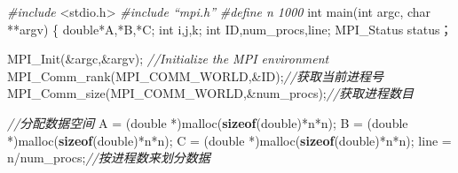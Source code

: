 \documentclass[]{ctexbook}
\newenvironment{Shaded}{\begin{snugshade}}{\end{snugshade}}
\newcommand{\CommentTok}[1]{\textcolor[rgb]{0.56,0.35,0.01}{\textit{#1}}}
\newcommand{\DataTypeTok}[1]{\textcolor[rgb]{0.13,0.29,0.53}{#1}}
\newcommand{\ImportTok}[1]{#1}
\newcommand{\KeywordTok}[1]{\textcolor[rgb]{0.13,0.29,0.53}{\textbf{#1}}}
\newcommand{\NormalTok}[1]{#1}
\newcommand{\PreprocessorTok}[1]{\textcolor[rgb]{0.56,0.35,0.01}{\textit{#1}}}
\begin{document}
\begin{Shaded}
\begin{Highlighting}[]
\PreprocessorTok{\#include }\ImportTok{\textless{}stdio.h\textgreater{}}
\PreprocessorTok{\#include “mpi.h”}
\PreprocessorTok{\#define n 1000}
\DataTypeTok{int}\NormalTok{ main(}\DataTypeTok{int}\NormalTok{ argc, }\DataTypeTok{char}\NormalTok{ **argv)}
\NormalTok{\{}
    \DataTypeTok{double}\NormalTok{*A,*B,*C;}
    \DataTypeTok{int}\NormalTok{ i,j,k;}
    \DataTypeTok{int}\NormalTok{ ID,num\_procs,line;}
\NormalTok{    MPI\_Status status；}

\NormalTok{    MPI\_Init(\&argc,\&argv); }\CommentTok{//Initialize the MPI environment}
\NormalTok{    MPI\_Comm\_rank(MPI\_COMM\_WORLD,\&ID);}\CommentTok{//获取当前进程号}
\NormalTok{    MPI\_Comm\_size(MPI\_COMM\_WORLD,\&num\_procs);}\CommentTok{//获取进程数目}

    \CommentTok{//分配数据空间}
\NormalTok{    A = (}\DataTypeTok{double}\NormalTok{ *)malloc(}\KeywordTok{sizeof}\NormalTok{(}\DataTypeTok{double}\NormalTok{)*n*n);}
\NormalTok{    B = (}\DataTypeTok{double}\NormalTok{ *)malloc(}\KeywordTok{sizeof}\NormalTok{(}\DataTypeTok{double}\NormalTok{)*n*n);}
\NormalTok{    C = (}\DataTypeTok{double}\NormalTok{ *)malloc(}\KeywordTok{sizeof}\NormalTok{(}\DataTypeTok{double}\NormalTok{)*n*n);}
\NormalTok{    line = n/num\_procs;}\CommentTok{//按进程数来划分数据}


\end{Highlighting}
\end{Shaded}
\end{document}
